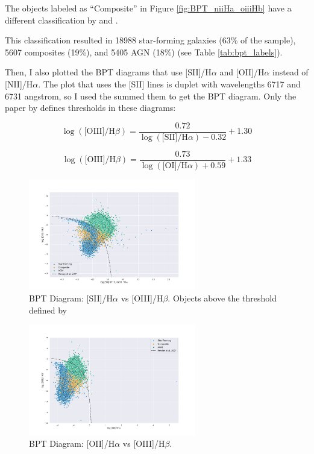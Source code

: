 \documentclass[letterpaper, oneside]{article}
\begin{document}
	The objects labeled as ``Composite'' in Figure \ref{fig:BPT_niiHa_oiiiHb} have a different classification by \cite{Kewley_2001} and \cite{Kauffmann_2003}.
	
	This classification resulted in 18988 star-forming galaxies (63\% of the sample), 5607 composites (19\%), and 5405 AGN (18\%) (see Table \ref{tab:bpt_labels}).

	Then, I also plotted the BPT diagrams that use [SII]/H$\alpha$ and [OII]/H$\alpha$ instead of [NII]/H$\alpha$. The plot that uses the [SII] lines is duplet with wavelengths 6717 and 6731 angstrom, so I used the summed them to get the BPT diagram. Only the paper by \cite{Kewley_2001} defines thresholds in these diagrams:
	
	\begin{equation} \label{kewley_SII}
		\log{ \left(  \text{[OIII]} / {\text{H}\beta} \right)  } = \frac{0.72}{\log{ \left(  \text{[SII]} / {\text{H}\alpha} \right)  } - 0.32} + 1.30
	\end{equation}
	
	\begin{equation} \label{kewley_OI}
		\log{ \left(  \text{[OIII]} / {\text{H}\beta} \right)  } = \frac{0.73}{\log{ \left(  \text{[OI]} / {\text{H}\alpha} \right)  } + 0.59} + 1.33
	\end{equation}
	
	\begin{figure}[H]
		\centering
		\includegraphics[width=0.65\textwidth]{../BPT_Diagrams/BPT_sii67176731Ha_oiiiHb.pdf}
		\caption{BPT Diagram: [SII]/H$\alpha$ vs [OIII]/H$\beta$. Objects above the threshold defined by \cite{Kewley_2001}}
		\label{fig:BPT_siiHa_oiiiHb}
	\end{figure}
	
	\begin{figure}[H]
		\centering
		\includegraphics[width=0.65\textwidth]{../BPT_Diagrams/BPT_oiHa_oiiiHb.pdf}
		\caption{BPT Diagram: [OII]/H$\alpha$ vs [OIII]/H$\beta$.}
		\label{fig:BPT_oiHa_oiiiHb}
	\end{figure}
\end{document}
